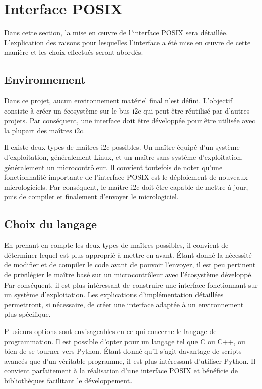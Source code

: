 \section{Interface POSIX}

Dans cette section, la mise en \oe{}uvre de l'interface POSIX sera détaillée. L'explication des raisons pour lesquelles l'interface a été mise en \oe{}uvre de cette manière et les choix effectués seront abordés.

\subsection{Environnement}

Dans ce projet, aucun environnement matériel final n'est défini. L'objectif consiste à créer un écosystème sur le bus \gls{i2c} qui peut être réutilisé par d'autres projets. Par conséquent, une interface doit être développée pour être utilisée avec la plupart des maîtres \gls{i2c}.

Il existe deux types de maîtres \gls{i2c} possibles. Un maître équipé d'un système d'exploitation, généralement Linux, et un maître sans système d'exploitation, généralement un microcontrôleur. Il convient toutefois de noter qu'une fonctionnalité importante de l'interface POSIX est le déploiement de nouveaux micrologiciels. Par conséquent, le maître \gls{i2c} doit être capable de mettre à jour, puis de compiler et finalement d'envoyer le micrologiciel.

\subsection{Choix du langage}

En prenant en compte les deux types de maîtres possibles, il convient de déterminer lequel est plus approprié à mettre en avant.
Étant donné la nécessité de modifier et de compiler le code avant de pouvoir l'envoyer, il est peu pertinent de privilégier le maître basé sur un microcontrôleur avec l'écosystème développé.
Par conséquent, il est plus intéressant de construire une interface fonctionnant sur un système d'exploitation. Les explications d'implémentation détaillées permettront, si nécessaire, de créer une interface adaptée à un environnement plus spécifique.

Plusieurs options sont envisageables en ce qui concerne le langage de programmation.
Il est possible d'opter pour un langage tel que C ou C++, ou bien de se tourner vers Python.
Étant donné qu'il s'agit davantage de scripts avancés que d'un véritable programme, il est plus intéressant d'utiliser Python.
Il convient parfaitement à la réalisation d'une interface POSIX et bénéficie de bibliothèques facilitant le développement.

